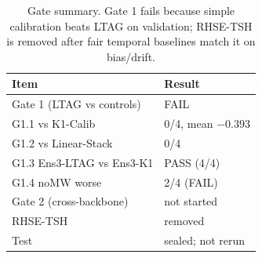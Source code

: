 \begin{table}[t]
\centering
\caption{Gate summary. Gate 1 fails because simple calibration beats LTAG on
validation; RHSE-TSH is removed after fair temporal baselines match it on
bias/drift.}
\label{tab:gates}
\begin{tabular}{ll}
\toprule
Item & Result \\
\midrule
Gate 1 (LTAG vs controls) & FAIL \\
\quad G1.1 vs K1-Calib & 0/4, mean $-0.393$ \\
\quad G1.2 vs Linear-Stack & 0/4 \\
\quad G1.3 Ens3-LTAG vs Ens3-K1 & PASS (4/4) \\
\quad G1.4 noMW worse & 2/4 (FAIL) \\
Gate 2 (cross-backbone) & not started \\
RHSE-TSH & removed \\
Test & sealed; not rerun \\
\bottomrule
\end{tabular}
\end{table}
